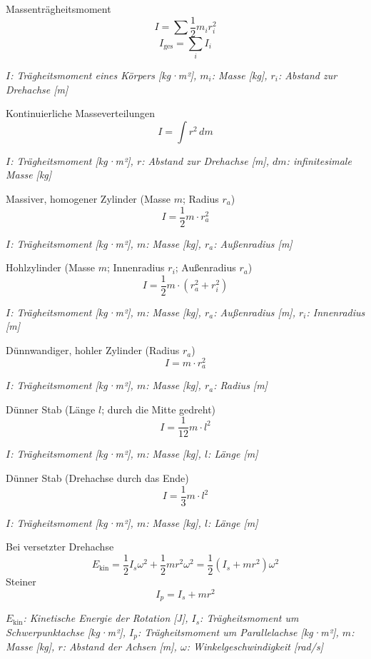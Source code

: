 \documentclass[a4paper,10pt]{article}
\newenvironment{displayformula}
{
	\begin{framed}
		\color{formulaColor}
	}
	{\end{framed}}
\newcommand{\formulalegend}[1]{%
	\par\vspace{0.5ex}%
	{{\color{legendColor}\RaggedRight\small\textit{#1}}}%
	\par\vspace{1.5ex}%
}
\begin{document}
\begin{displayformula}
	Massenträgheitsmoment
	\[
	I = \sum \frac{1}{2} m_i r_i^2 
	\]
	\[
	I_{\text{ges}} = \sum_i I_i
	\]
\end{displayformula}
\formulalegend{
	\( I \): Trägheitsmoment eines Körpers [kg·m²], \( m_i \): Masse [kg], \( r_i \): Abstand zur Drehachse [m]
}

\begin{displayformula}
	Kontinuierliche Masseverteilungen
	\[
	I = \int r^2 \, dm
	\]
\end{displayformula}
\formulalegend{
	\( I \): Trägheitsmoment [kg·m²], \( r \): Abstand zur Drehachse [m], \( dm \): infinitesimale Masse [kg]
}
\begin{displayformula}
	Massiver, homogener Zylinder (Masse \( m \); Radius \( r_a \))
	\[
	I = \frac{1}{2} m \cdot r_a^2
	\]
\end{displayformula}
\formulalegend{
	\( I \): Trägheitsmoment [kg·m²], \( m \): Masse [kg], \( r_a \): Außenradius [m]
}

\begin{displayformula}
	Hohlzylinder (Masse \( m \); Innenradius \( r_i \); Außenradius \( r_a \))
	\[
	I = \frac{1}{2} m \cdot (r_a^2 + r_i^2)
	\]
\end{displayformula}
\formulalegend{
	\( I \): Trägheitsmoment [kg·m²], \( m \): Masse [kg], \( r_a \): Außenradius [m], \( r_i \): Innenradius [m]
}

\begin{displayformula}
	Dünnwandiger, hohler Zylinder (Radius \( r_a \))
	\[
	I = m \cdot r_a^2
	\]
\end{displayformula}
\formulalegend{
	\( I \): Trägheitsmoment [kg·m²], \( m \): Masse [kg], \( r_a \): Radius [m]
}

\begin{displayformula}
	Dünner Stab (Länge \( l \); durch die Mitte gedreht)
	\[
	I = \frac{1}{12} m \cdot l^2
	\]
\end{displayformula}
\formulalegend{
	\( I \): Trägheitsmoment [kg·m²], \( m \): Masse [kg], \( l \): Länge [m]
}

\begin{displayformula}
	Dünner Stab (Drehachse durch das Ende)
	\[
	I = \frac{1}{3} m \cdot l^2
	\]
\end{displayformula}
\formulalegend{
	\( I \): Trägheitsmoment [kg·m²], \( m \): Masse [kg], \( l \): Länge [m]
}

\begin{displayformula}
	Bei versetzter Drehachse
	\[
	E_{\text{kin}} = \frac{1}{2} I_s \omega^2 + \frac{1}{2} m r^2 \omega^2 = \frac{1}{2} (I_s + m r^2) \omega^2
	\]
	Steiner
	\[
	I_p = I_s + m r^2
	\]
\end{displayformula}
\formulalegend{
	\( E_{\text{kin}} \): Kinetische Energie der Rotation [J], \( I_s \): Trägheitsmoment um Schwerpunktachse [kg·m²], \( I_p \): Trägheitsmoment um Parallelachse [kg·m²], \( m \): Masse [kg], \( r \): Abstand der Achsen [m], \( \omega \): Winkelgeschwindigkeit [rad/s]
}
\end{document}
